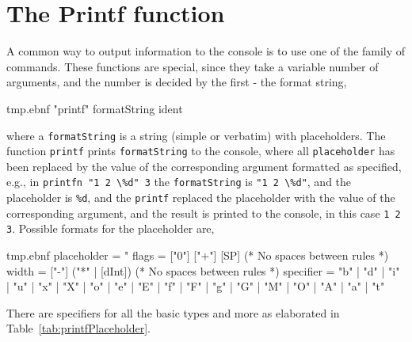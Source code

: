 \section{The Printf function}
\label{sec:printf}
A common way to output information to the console is to use one of the family of  commands. These functions are special, since they take a variable number of arguments, and the number is decided by the first - the format string,
%
\begin{verbatimwrite}{tmp.ebnf}
"printf" formatString {ident}
\end{verbatimwrite}
%
where a \lstinline[language=ebnf]!formatString! is a string (simple or verbatim) with placeholders. The function \lstinline[language=ebnf]!printf! prints \lstinline[language=ebnf]!formatString! to the console, where all \lstinline[language=ebnf]!placeholder! has been replaced by the value of the corresponding argument formatted as specified, e.g., in \mbox{\lstinline!printfn "1 2 \%d" 3!} the \lstinline[language=ebnf]!formatString! is \mbox{\lstinline!"1 2 \%d"!}, and the placeholder is \lstinline{%d}, %
and the \lstinline{printf} replaced the placeholder with the value of the corresponding argument, and the result is printed to the console, in this case \mbox{\lstinline!1 2 3!}. Possible formats for the placeholder are,
%
\begin{verbatimwrite}{tmp.ebnf}
placeholder = "%
flags = ["0"] ["+"] [SP] (* No spaces between rules *)
width = ["-"] ("*" | [dInt]) (* No spaces between rules *)
specifier = "b" | "d" | "i" | "u" | "x" | "X" | "o" | "e" | "E" | "f" | "F" | "g" | "G" | "M" | "O" | "A" | "a" | "t"
\end{verbatimwrite}
%
There are specifiers for all the basic types and more as elaborated in Table~\ref{tab:printfPlaceholder}.
